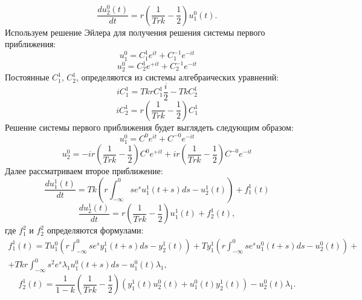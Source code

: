 \documentclass[12pt]{article}
\begin{document}
\begin{equation*}
   \frac{d u_2^0(t)}{d t}= r(\frac{1}{T r k} -\frac{1}{2})u_1^0(t).
\end{equation*}
 Используем решение Эйлера для получения решения системы первого приближения:
  \begin{equation*}
    u_1^0=C_1^1 e^{i t}+C_1^{-1} e^{-i t}
 \end{equation*}
 \begin{equation*}
    u_2^0=C_2^1 e^{+i t}+C_2^{-1} e^{-i t}
 \end{equation*}
 Постоянные $C_1^1$, $C_2^1$, определяются из системы алгебраических уравнений:
 \begin{equation*}
     i C_1^1=T k r C_1^1 \frac{i}{2}- T k C_2^1
 \end{equation*}
 \begin{equation*}
     i C_2^1=r \left(  \frac{1}{T r k} - \frac{1}{2}\right) C_1^1
 \end{equation*}
 Решение системы первого приближения будет выглядеть следующим образом:
 \begin{equation*}
    u_1^0= C^0 e^{i t}+ C^{-0} e^{-i t}
 \end{equation*}
 \begin{equation*}
    u_2^0=-i r \left(  \frac{1}{T r k} - \frac{1}{2}\right) C^0 e^{+i t}+ i r \left(  \frac{1}{T r k} - \frac{1}{2}\right) C^{-0} e^{-i t}
 \end{equation*}
 Далее рассматриваем второе приближение:
\begin{equation}\label{su1}
       \frac{d u^1_1(t)}{d t}=T k (r \int_{-\infty}^{0} s e^{s}u^1_1(t+s)d s -  u^1_2 (t) ) + f^1_1 (t)
   \end{equation}
   \begin{equation*}
   \frac{d u^1_2(t)}{d t}= r(\frac{1}{T r k} -\frac{1}{2})u^1_1(t)+f^1_2 (t) ,
\end{equation*}
где $ f^2_1 $ и $f^2_2$ определяются формулами:
\begin{multline}
    f^1_1 (t)=T u_1^0 \left( r \int_{-\infty}^{0} s e^{s} y_1^1(t+s) d s - y_2^1 (t) \right)+T y_1^1 \left( r \int_{-\infty}^{0} s e^{s} u_1^0(t+s) d s -u_2^0 (t) \right)+\\+ T k r \int_{-\infty}^{0} s^2 e^{s} \lambda_1 u_1^0(t+s) d s - u_1^0 (t) \lambda_1 ,
    \end{multline}
    \begin{equation*}
    f^1_2(t)=\frac{1}{1-k}(\frac{1}{T r k} -\frac{1}{2}) \left(y_1^1 (t) u^0_2 (t) + u_1^0 (t) y^1_2 (t) \right) - u_2^0(t) \lambda_1.
    \end{equation*}
\end{document}
